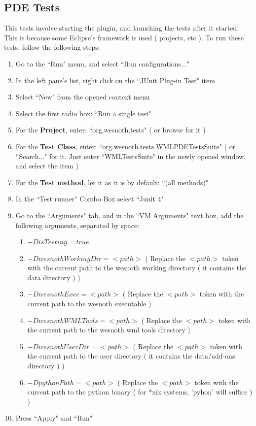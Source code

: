 \documentclass[10pt]{article}
\begin{document}
\subsection{PDE Tests}
This tests involve starting the plugin, and launching the tests after it started. This is because some Eclipse's framework is used ( projects, etc ). To run these tests, follow the following steps:
\begin{enumerate}
	\item Go to the ``Run" menu, and select ``Run configurations..."
	\item In the left pane's list, right click on the ``JUnit Plug-in Test" item
	\item Select ``New" from the opened context menu
	\item Select the first radio box: ``Run a single test"
	\item For the \textbf{Project}, enter: ``org.wesnoth.tests" ( or browse for it )
	\item For the \textbf{Test Class}, enter: ``org.wesnoth.tests.WMLPDETestsSuite" ( or ``Search..." for it. Just enter ``WMLTestsSuite" in the newly opened window, and select the item )
	\item For the \textbf{Test method}, let it as it is by default: ``(all methods)"
	\item In the ``Test runner" Combo Box select ``Junit 4"
	\item Go to the ``Arguments" tab, and in the ``VM Arguments" text box, add the following arguments, separated by space: 
	\begin{enumerate}
		\item $-DisTesting=true$
		\item $-DwesnothWorkingDir=<path>$ ( Replace the $<path>$ token with the current path to the wesnoth working directory ( it contains the data directory ) )
		\item $-DwesnothExec=<path>$ ( Replace the $<path>$ token with the current path to the wesnoth executable )
		\item $-DwesnothWMLTools=<path>$ ( Replace the $<path>$ token with the current path to the wesnoth wml tools directory )
		\item $-DwesnothUserDir=<path>$ ( Replace the $<path>$ token with the current path to the user directory ( it contains the data/add-ons directory ) )
		\item $-DpythonPath=<path>$ ( Replace the $<path>$ token with the current path to the python binary ( for *nix systems, 'pyhon' will suffice ) )
	\end{enumerate}
	\item Press ``Apply" and ``Run"
\end{enumerate}	
\end{document}
